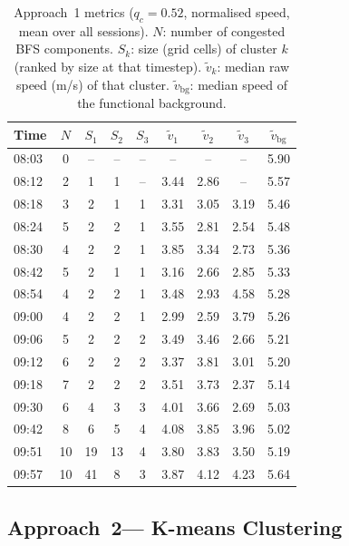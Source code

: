 \documentclass[11pt,a4paper]{article}
\begin{document}
\begin{table}[H]
  \centering
  \small
  \caption{Approach~1 metrics ($q_c = 0.52$, normalised speed, mean over all
    sessions).  $N$: number of congested BFS components.  $S_k$: size (grid
    cells) of cluster $k$ (ranked by size at that timestep).  $\tilde{v}_k$:
    median raw speed (m/s) of that cluster.  $\tilde{v}_{\mathrm{bg}}$: median
    speed of the functional background.}
  \label{tab:merge_metrics}
  \setlength{\tabcolsep}{5pt}
  \begin{tabular}{l c ccc ccc c}
    \toprule
    Time  & $N$ & $S_1$ & $S_2$ & $S_3$
          & $\tilde{v}_1$ & $\tilde{v}_2$ & $\tilde{v}_3$
          & $\tilde{v}_{\mathrm{bg}}$ \\
    \midrule
    08:03 &  0 & --  & --  & --  & --   & --   & --   & 5.90 \\
    08:12 &  2 &  1  &  1  & --  & 3.44 & 2.86 & --   & 5.57 \\
    08:18 &  3 &  2  &  1  &  1  & 3.31 & 3.05 & 3.19 & 5.46 \\
    08:24 &  5 &  2  &  2  &  1  & 3.55 & 2.81 & 2.54 & 5.48 \\
    08:30 &  4 &  2  &  2  &  1  & 3.85 & 3.34 & 2.73 & 5.36 \\
    08:42 &  5 &  2  &  1  &  1  & 3.16 & 2.66 & 2.85 & 5.33 \\
    08:54 &  4 &  2  &  2  &  1  & 3.48 & 2.93 & 4.58 & 5.28 \\
    09:00 &  4 &  2  &  2  &  1  & 2.99 & 2.59 & 3.79 & 5.26 \\
    09:06 &  5 &  2  &  2  &  2  & 3.49 & 3.46 & 2.66 & 5.21 \\
    09:12 &  6 &  2  &  2  &  2  & 3.37 & 3.81 & 3.01 & 5.20 \\
    09:18 &  7 &  2  &  2  &  2  & 3.51 & 3.73 & 2.37 & 5.14 \\
    09:30 &  6 &  4  &  3  &  3  & 4.01 & 3.66 & 2.69 & 5.03 \\
    09:42 &  8 &  6  &  5  &  4  & 4.08 & 3.85 & 3.96 & 5.02 \\
    09:51 & 10 & 19  & 13  &  4  & 3.80 & 3.83 & 3.50 & 5.19 \\
    09:57 & 10 & 41  &  8  &  3  & 3.87 & 4.12 & 4.23 & 5.64 \\
    \bottomrule
  \end{tabular}
\end{table}


\subsection{Approach~2--- K-means Clustering}
\label{sec:methods:kclustering}
\end{document}
